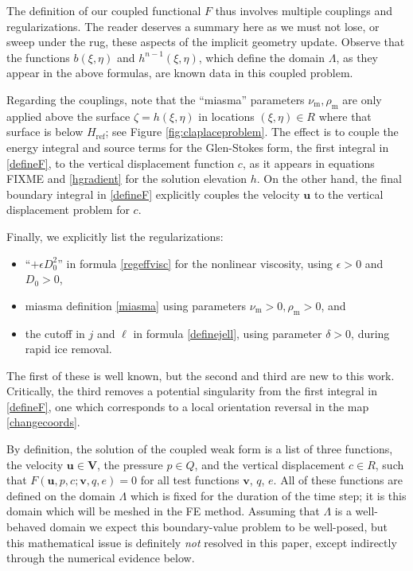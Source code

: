 \documentclass[letterpaper,final,12pt,reqno]{amsart}
\newcommand{\eps}{\epsilon}
\newcommand{\bu}{\mathbf{u}}
\newcommand{\bv}{\mathbf{v}}
\newcommand{\bV}{\mathbf{V}}
\newcommand{\Href}{H_{\text{ref}}}
\newcommand{\num}{\nu_{\text{m}}}
\newcommand{\rhom}{\rho_{\text{m}}}
\begin{document}
The definition of our coupled functional $F$ thus involves multiple couplings and regularizations.  The reader deserves a summary here as we must not lose, or sweep under the rug, these aspects of the implicit geometry update.  Observe that the functions $b(\xi,\eta)$ and $h^{n-1}(\xi,\eta)$, which define the domain $\Lambda$, as they appear in the above formulas, are known data in this coupled problem.

Regarding the couplings, note that the ``miasma'' parameters $\num,\rhom$ are only applied above the surface $\zeta=h(\xi,\eta)$ in locations $(\xi,\eta) \in R$ where that surface is below $\Href$; see Figure \ref{fig:claplaceproblem}.  The effect is to couple the energy integral and source terms for the Glen-Stokes form, the first integral in \eqref{defineF}, to the vertical displacement function $c$, as it appears in equations FIXME and \eqref{hgradient} for the solution elevation $h$.  On the other hand, the final boundary integral in \eqref{defineF} explicitly couples the velocity $\bu$ to the vertical displacement problem for $c$.

Finally, we explicitly list the regularizations:
\begin{itemize}
\item ``$+\eps D_0^2$'' in formula \eqref{regeffvisc} for the nonlinear viscosity, using $\eps>0$ and $D_0>0$,
\item miasma definition \eqref{miasma} using parameters $\num>0,\rhom>0$, and
\item the cutoff in $j$ and $\ell$ in formula \eqref{definejell}, using parameter $\delta>0$, during rapid ice removal.
\end{itemize}
The first of these is well known, but the second and third are new to this work.  Critically, the third removes a potential singularity from the first integral in \eqref{defineF}, one which corresponds to a local orientation reversal in the map \eqref{changecoords}.

By definition, the solution of the coupled weak form is a list of three functions, the velocity $\bu \in \bV$, the pressure $p\in Q$, and the vertical displacement $c\in R$, such that $F(\bu,p,c;\bv,q,e) = 0$ for all test functions $\bv$, $q$, $e$.  All of these functions are defined on the domain $\Lambda$ which is fixed for the duration of the time step; it is this domain which will be meshed in the FE method.  Assuming that $\Lambda$ is a well-behaved domain we expect this boundary-value problem to be well-posed, but this mathematical issue is definitely \emph{not} resolved in this paper, except indirectly through the numerical evidence below.
\end{document}
